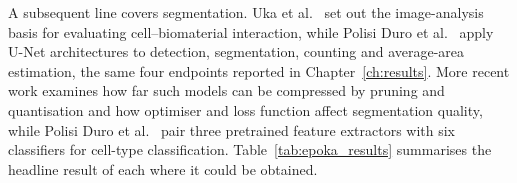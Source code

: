 A subsequent line covers segmentation. Uka et al.\ \cite{uka2021basis} set out the
image-analysis basis for evaluating cell--biomaterial interaction, while Polisi
Duro et al.\ \cite{polisi2024detection} apply U-Net architectures to detection,
segmentation, counting and average-area estimation, the same four endpoints
reported in Chapter~\ref{ch:results}. More recent work
\cite{polisi2023pruning, polisi2025efficient} examines how far such models can be
compressed by pruning and quantisation and how optimiser and loss function affect
segmentation quality, while Polisi Duro et al.\ \cite{polisiduro2025optimizing}
pair three pretrained feature extractors with six classifiers for cell-type
classification. Table~\ref{tab:epoka_results} summarises the headline result of
each where it could be obtained.

\begin{table}[htbp]
    \centering


\end{table}
